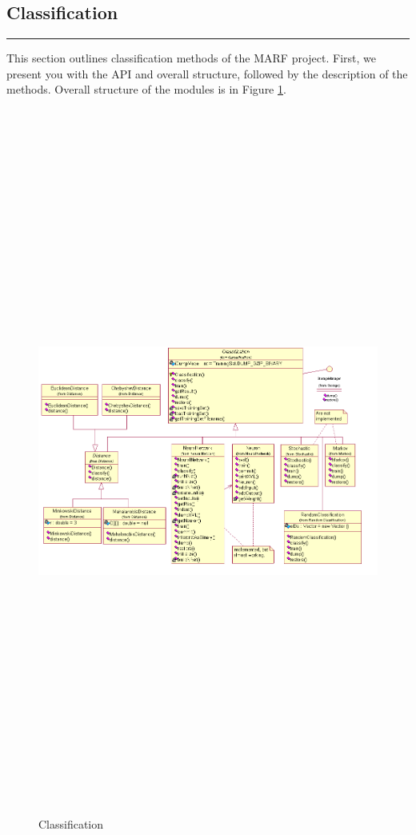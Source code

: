 \subsection{Classification}
\noindent
\rule{7.0in}{.013in}

This section outlines classification methods of the MARF project.
First, we present you with the API and overall structure, followed
by the description of the methods. Overall structure of the modules
is in Figure \ref{fig:classification}.

\begin{figure}
	\centering
	\includegraphics[angle=90,height=660pt]{../graphics/arch/classification.png}
	\caption{Classification}
	\label{fig:classification}
\end{figure}












